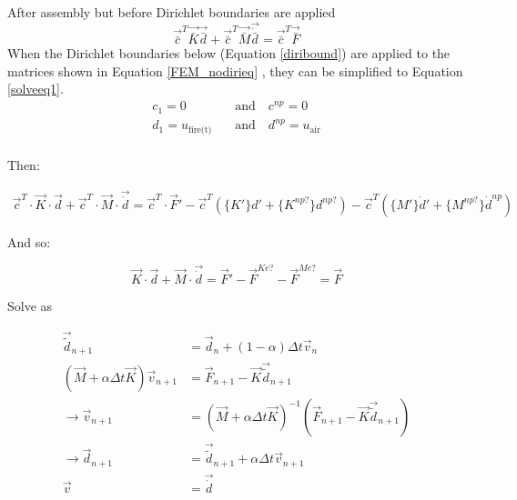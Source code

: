 After assembly but before Dirichlet boundaries are applied 
\begin{equation}%
\vec{\bar{c}}^T \vec{\bar{K}} \vec{\bar{d}} + \vec{\bar{c}}^T \vec{\bar{M}} \vec{\dot{\bar{d}}} = \vec{\bar{c}}^T \vec{\bar{F}}
\end{equation}
When the Dirichlet boundaries below (Equation \ref{diribound}) are applied to the matrices shown in Equation \ref{FEM_nodirieq} , they can be simplified to Equation \ref{solveeq1}.
\begin{equation}%
\begin{aligned}
c_1 = 0 \quad &\text{and} \quad c^{np}=0\\
d_1 = u_{\text{fire(t)}}\quad &\text{and} \quad d^{np} = u_{\text{air}}\\
\end{aligned}
\end{equation}

Then:

\begin{equation}%
\begin{aligned}
\vec{c}^T\cdot\vec{K}\cdot\vec{d} + \vec{c}^T\cdot\vec{M}\cdot\vec{\dot{d}} = \vec{c}^T\cdot\vec{F}' - \vec{c}^T\left(
	\{K'\}d'
	+ \{K^{np?}\}d^{np?}
\right)
- \vec{c}^T \left(
	\{M'\}\dot{d}' + \{M^{np?}\}\dot{d}^{np}
\right)
\end{aligned}
\end{equation}


And so:

\begin{equation}%
\vec{K}\cdot\vec{d} + \vec{M}\cdot\vec{\dot{d}} = \vec{F}' - \vec{F}^{Ke?} - \vec{F}^{Me?} = \vec{F}
\end{equation}

Solve as

\begin{equation}%
\begin{aligned}
\vec{\tilde{d}}_{n+1} &= \vec{d}_n + (1-\alpha)\Delta t \vec{v}_n \\
(\vec{M} + \alpha\Delta t\vec{K})\vec{v}_{n+1} &= \vec{F}_{n+1} - \vec{K} \vec{\tilde{d}}_{n+1} \\
\rightarrow \vec{v}_{n+1} &= (\vec{M} + \alpha\Delta t \vec{K})^{-1} (\vec{F}_{n+1} - \vec{K} \vec{\tilde{d}}_{n+1}) \\
\rightarrow \vec{d}_{n+1} &= \vec{\tilde{d}}_{n+1} + \alpha\Delta t \vec{v}_{n+1} \\
\vec{v} &= \vec{\dot{d}}
\end{aligned}
\end{equation}